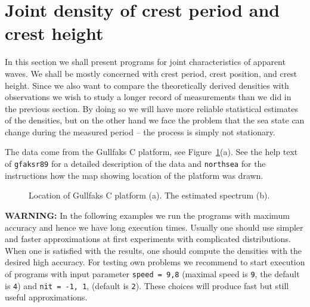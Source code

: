 \section{Joint density of crest period and crest
  height}\label{sec:joint_crest_period_and_height}

In this section we shall present programs for joint characteristics
of apparent waves. We shall be mostly concerned with crest period,
crest position, and crest height. Since we also want to compare the
theoretically derived densities with observations we wish to study
a longer record of measurements than we did in the previous section.
By doing so we will have more reliable statistical estimates of
the densities, but on the other hand we face the problem that the
sea state can change during the measured period -- the process is
simply not stationary.

The data come from the Gullfaks C platform, see
Figure~\ref{fig7northsea}(a). See the help text of {\tt gfaksr89}
for a detailed description of the data  and {\tt northsea}
for the instructions how the map showing location of
the platform was drawn. 

\begin{figure}[htbp]
%
\hfill
{}
\vspace{-3mm}
  \caption[Location of Gullfaks C platform and estimated spectrum]
{Location of Gullfaks C platform (a). The estimated spectrum (b).
}
 \label{fig7northsea}
\end{figure}

\bigskip
\noindent
{\bf WARNING:} In the following examples we run the programs with
maximum accuracy and hence we have long execution times.
Usually one should use simpler and faster approximations at first
experiments with complicated distributions. When one is satisfied with the
results, one should compute the densities
with the desired high accuracy. For testing own problems  we recommend
to start execution of programs with input parameter {\tt speed = 9,8}
(maximal speed is {\tt 9}, the default is {\tt 4}) and {\tt nit = -1, 1},
(default is {\tt 2}).
These choices will produce fast but still useful approximations.

